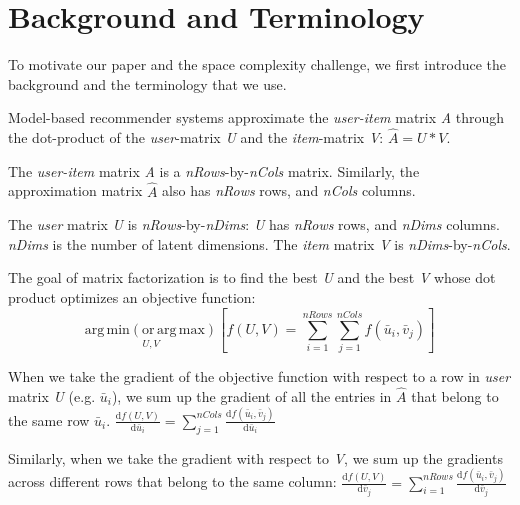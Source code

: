 \section{Background and Terminology}
To motivate our paper and the space complexity challenge, we first introduce the background and the terminology that we use.  


Model-based recommender systems approximate the \emph{user-item} matrix \emph{A} through 
the dot-product of the \emph{user}-matrix \emph{U} and the \emph{item}-matrix \emph{V}: $\hat{A} = U * V.$  

The \emph{user-item} matrix \emph{A} is a \emph{nRows}-by-\emph{nCols} matrix.  
Similarly, the approximation matrix $\hat{A}$ also has \emph{nRows} rows, and \emph{nCols} columns.  

The \emph{user} matrix \emph{U} is \emph{nRows}-by-\emph{nDims}: \emph{U} has \emph{nRows} rows, and \emph{nDims} columns.  
\emph{nDims} is the number of latent dimensions.  
The \emph{item} matrix \emph{V} is \emph{nDims}-by-\emph{nCols}.  


The goal of matrix factorization is to find the best \emph{U} and the best \emph{V} whose dot product optimizes an objective function:
\[ 
\operatorname*{arg\,min (or\,arg\,max)}_{U,V} \left[ f(U, V) = \sum_{i=1}^{nRows} \sum_{j=1}^{nCols} f(\bar{u}_{i}, \bar{v}_{j}) \right]
\]

When we take the gradient of the objective function with respect to a row in \emph{user} matrix \emph{U} (e.g. $\bar{u}_{i}$), 
we sum up the gradient of all the entries in $\hat{A}$ that belong to the same row $\bar{u}_{i}$.  
$
\frac{\text{d}f(U,V)}{\text{d}\bar{u}_i} = \sum_{j=1}^{nCols} \frac{\text{d}f(\bar{u}_i,\bar{v}_j)}{\text{d}\bar{u}_i}
$

Similarly, when we take the gradient with respect to \emph{V}, we sum up the gradients across different rows that belong to the same column: 
$
\frac{\text{d}f(U,V)}{\text{d}\bar{v}_j} = \sum_{i=1}^{nRows} \frac{\text{d}f(\bar{u}_i,\bar{v}_j)}{\text{d}\bar{v}_j}
$

